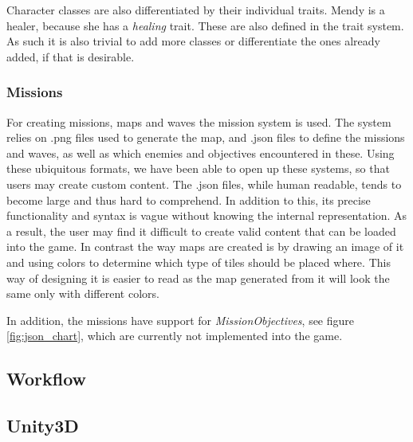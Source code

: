 Character classes are also differentiated by their individual traits.
Mendy is a healer, because she has a \emph{healing} trait.
These are also defined in the trait system.
As such it is also trivial to add more classes or differentiate the ones already added, if that is desirable.

\subsubsection{Missions}\label{dicsussion:missions}
For creating missions, maps and waves the mission system is used.
The system relies on .png files used to generate the map, and .json files to define the missions and waves, as well as which enemies and objectives encountered in these.
Using these ubiquitous formats, we have been able to open up these systems, so that users may create custom content.
The .json files, while human readable, tends to become large and thus hard to comprehend.
In addition to this, its precise functionality and syntax is vague without knowing the internal representation.
As a result, the user may find it difficult to create valid content that can be loaded into the game.
In contrast the way maps are created is by drawing an image of it and using colors to determine which type of tiles should be placed where. This way of designing it is easier to read as the map generated from it will look the same only with different colors.

In addition, the missions have support for \textit{MissionObjectives}, see figure \ref{fig:json_chart}, which are currently not implemented into the game.

\subsection{Workflow}

\subsection{Unity3D}




%

